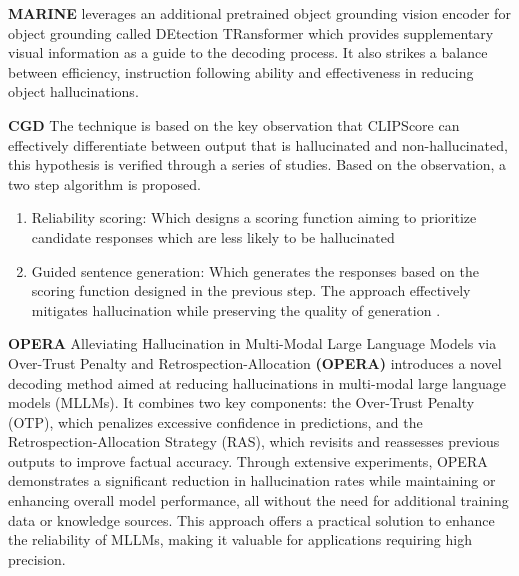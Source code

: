 \documentclass[twocolumn, 9pt]{extarticle}
\begin{document}
\textbf{MARINE}  leverages an additional pretrained object grounding vision encoder for object grounding called DEtection TRansformer which provides supplementary visual information as a guide to the decoding process. It also strikes a balance between efficiency, instruction following ability and effectiveness in reducing object hallucinations. 

\textbf{CGD} 
The technique is based on the key observation that CLIPScore can effectively differentiate between output that is hallucinated and non-hallucinated, this hypothesis is verified through a series of studies. Based on the observation, a two step algorithm is proposed.
\begin{enumerate}
    \item Reliability scoring: Which designs a scoring function aiming to prioritize candidate responses which are less likely to be hallucinated
    \item Guided sentence generation: Which generates the responses based on the scoring function designed in the previous step. The approach effectively mitigates hallucination while preserving the quality of generation .
\end{enumerate}

\textbf{OPERA} \cite{huang2024operaalleviatinghallucinationmultimodal}
Alleviating Hallucination in Multi-Modal Large Language Models via Over-Trust Penalty and Retrospection-Allocation \textbf{(OPERA)} introduces a novel decoding method aimed at reducing hallucinations in multi-modal large language models (MLLMs). It combines two key components: the Over-Trust Penalty (OTP), which penalizes excessive confidence in predictions, and the Retrospection-Allocation Strategy (RAS), which revisits and reassesses previous outputs to improve factual accuracy. Through extensive experiments, OPERA demonstrates a significant reduction in hallucination rates while maintaining or enhancing overall model performance, all without the need for additional training data or knowledge sources. This approach offers a practical solution to enhance the reliability of MLLMs, making it valuable for applications requiring high precision.
\end{document}

